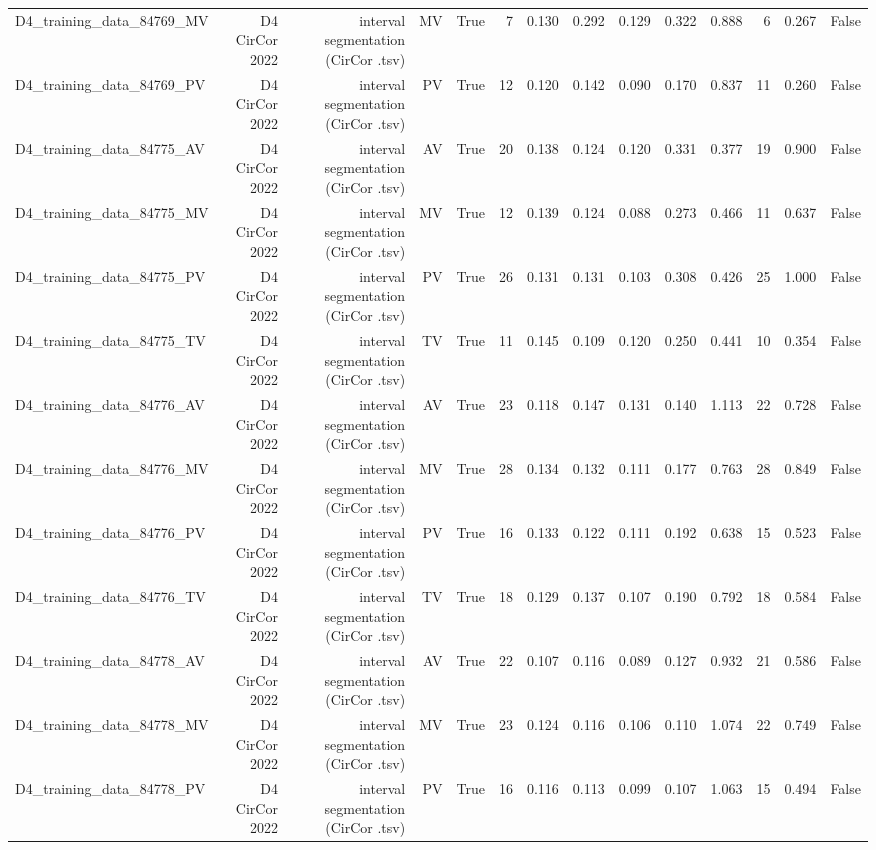 \begin{table}[htbp]
\begin{tabular}{lrrrrrrrrrrrrr}
    D4\_training\_data\_84769\_MV & D4 CirCor 2022 & interval segmentation (CirCor .tsv) & MV & True & 7 & 0.130 & 0.292 & 0.129 & 0.322 & 0.888 & 6 & 0.267 & False \\
    D4\_training\_data\_84769\_PV & D4 CirCor 2022 & interval segmentation (CirCor .tsv) & PV & True & 12 & 0.120 & 0.142 & 0.090 & 0.170 & 0.837 & 11 & 0.260 & False \\
    D4\_training\_data\_84775\_AV & D4 CirCor 2022 & interval segmentation (CirCor .tsv) & AV & True & 20 & 0.138 & 0.124 & 0.120 & 0.331 & 0.377 & 19 & 0.900 & False \\
    D4\_training\_data\_84775\_MV & D4 CirCor 2022 & interval segmentation (CirCor .tsv) & MV & True & 12 & 0.139 & 0.124 & 0.088 & 0.273 & 0.466 & 11 & 0.637 & False \\
    D4\_training\_data\_84775\_PV & D4 CirCor 2022 & interval segmentation (CirCor .tsv) & PV & True & 26 & 0.131 & 0.131 & 0.103 & 0.308 & 0.426 & 25 & 1.000 & False \\
    D4\_training\_data\_84775\_TV & D4 CirCor 2022 & interval segmentation (CirCor .tsv) & TV & True & 11 & 0.145 & 0.109 & 0.120 & 0.250 & 0.441 & 10 & 0.354 & False \\
    D4\_training\_data\_84776\_AV & D4 CirCor 2022 & interval segmentation (CirCor .tsv) & AV & True & 23 & 0.118 & 0.147 & 0.131 & 0.140 & 1.113 & 22 & 0.728 & False \\
    D4\_training\_data\_84776\_MV & D4 CirCor 2022 & interval segmentation (CirCor .tsv) & MV & True & 28 & 0.134 & 0.132 & 0.111 & 0.177 & 0.763 & 28 & 0.849 & False \\
    D4\_training\_data\_84776\_PV & D4 CirCor 2022 & interval segmentation (CirCor .tsv) & PV & True & 16 & 0.133 & 0.122 & 0.111 & 0.192 & 0.638 & 15 & 0.523 & False \\
    D4\_training\_data\_84776\_TV & D4 CirCor 2022 & interval segmentation (CirCor .tsv) & TV & True & 18 & 0.129 & 0.137 & 0.107 & 0.190 & 0.792 & 18 & 0.584 & False \\
    D4\_training\_data\_84778\_AV & D4 CirCor 2022 & interval segmentation (CirCor .tsv) & AV & True & 22 & 0.107 & 0.116 & 0.089 & 0.127 & 0.932 & 21 & 0.586 & False \\
    D4\_training\_data\_84778\_MV & D4 CirCor 2022 & interval segmentation (CirCor .tsv) & MV & True & 23 & 0.124 & 0.116 & 0.106 & 0.110 & 1.074 & 22 & 0.749 & False \\
    D4\_training\_data\_84778\_PV & D4 CirCor 2022 & interval segmentation (CirCor .tsv) & PV & True & 16 & 0.116 & 0.113 & 0.099 & 0.107 & 1.063 & 15 & 0.494 & False \\

\end{tabular}
\end{table}
